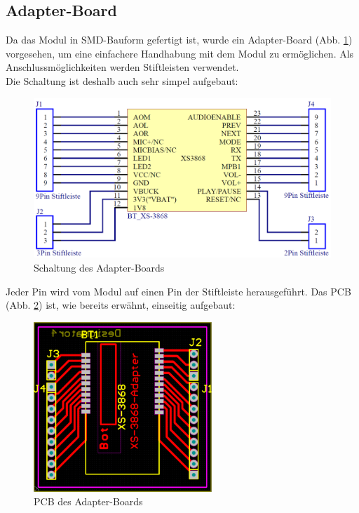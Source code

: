 

\subsection*{Adapter-Board} \label{subsec:5.3.7}
Da das Modul in SMD-Bauform gefertigt ist, wurde ein Adapter-Board (Abb. \ref{fig:5.3.7.1}) vorgesehen, um eine einfachere Handhabung mit dem Modul zu ermöglichen.
Als Anschlussmöglichkeiten werden Stiftleisten verwendet.
\\
Die Schaltung ist deshalb auch sehr simpel aufgebaut:
\begin{figure} [H]
	\centering
	\includegraphics[width=1\textwidth]{img/BTModul/adapter_sch.png}
	\caption{Schaltung des Adapter-Boards}\label {fig:5.3.7.1}
\end{figure} 
Jeder Pin wird vom Modul auf einen Pin der Stiftleiste herausgeführt.
\newpage
Das PCB (Abb. \ref{fig:5.3.7.2}) ist, wie bereits erwähnt, einseitig aufgebaut:
\begin{figure} [H]
	\centering
	\includegraphics[width=0.6\textwidth]{img/BTModul/adapter_pcb.png}
	\caption{PCB des Adapter-Boards}\label {fig:5.3.7.2}
\end{figure} 
